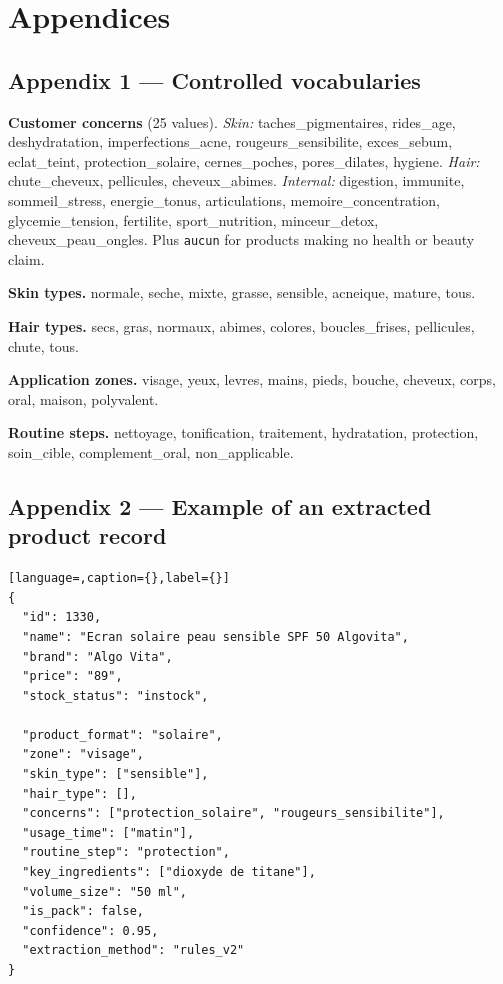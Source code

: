 ﻿%
\clearpage
{}
{}
\chapter*{Appendices}

\section*{Appendix 1 --- Controlled vocabularies}

\textbf{Customer concerns} (25 values).
\emph{Skin:} taches\_pigmentaires, rides\_age, deshydratation,
imperfections\_acne, rougeurs\_sensibilite, exces\_sebum, eclat\_teint,
protection\_solaire, cernes\_poches, pores\_dilates, hygiene.
\emph{Hair:} chute\_cheveux, pellicules, cheveux\_abimes.
\emph{Internal:} digestion, immunite, sommeil\_stress, energie\_tonus,
articulations, memoire\_concentration, glycemie\_tension, fertilite,
sport\_nutrition, minceur\_detox, cheveux\_peau\_ongles.
Plus \texttt{aucun} for products making no health or beauty claim.

\medskip
\textbf{Skin types.} normale, seche, mixte, grasse, sensible, acneique, mature,
tous.

\medskip
\textbf{Hair types.} secs, gras, normaux, abimes, colores, boucles\_frises,
pellicules, chute, tous.

\medskip
\textbf{Application zones.} visage, yeux, levres, mains, pieds, bouche, cheveux,
corps, oral, maison, polyvalent.

\medskip
\textbf{Routine steps.} nettoyage, tonification, traitement, hydratation,
protection, soin\_cible, complement\_oral, non\_applicable.

\section*{Appendix 2 --- Example of an extracted product record}

\begin{lstlisting}[language=,caption={},label={}]
{
  "id": 1330,
  "name": "Ecran solaire peau sensible SPF 50 Algovita",
  "brand": "Algo Vita",
  "price": "89",
  "stock_status": "instock",

  "product_format": "solaire",
  "zone": "visage",
  "skin_type": ["sensible"],
  "hair_type": [],
  "concerns": ["protection_solaire", "rougeurs_sensibilite"],
  "usage_time": ["matin"],
  "routine_step": "protection",
  "key_ingredients": ["dioxyde de titane"],
  "volume_size": "50 ml",
  "is_pack": false,
  "confidence": 0.95,
  "extraction_method": "rules_v2"
}
\end{lstlisting}

